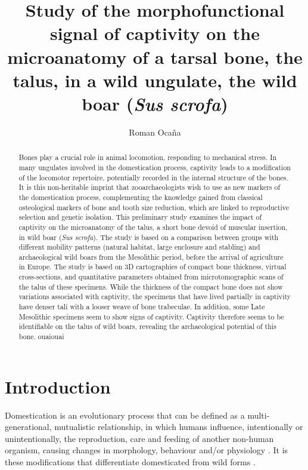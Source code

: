 \documentclass[12pt,a4paper]{article}
\title{Study of the morphofunctional signal of captivity on the microanatomy of a tarsal bone, the talus, in a wild ungulate, the wild boar (\textit{Sus scrofa})}
\author{Roman Ocaña}
\begin{document}
\maketitle
\tableofcontents
\setcounter{tocdepth}{6}

\begin{abstract}
    Bones play a crucial role in animal locomotion, responding to mechanical stress. In
many ungulates involved in the domestication process, captivity leads to a modification of the
locomotor repertoire, potentially recorded in the internal structure of the bones. It is this non-heritable imprint that zooarchaeologists wish to use as new markers of the domestication
process, complementing the knowledge gained from classical osteological markers of bone
and tooth size reduction, which are linked to reproductive selection and genetic isolation. This
preliminary study examines the impact of captivity on the microanatomy of the talus, a short
bone devoid of muscular insertion, in wild boar (\textit{Sus scrofa}). The study is based on a comparison between groups with different mobility patterns (natural habitat, large enclosure and stabling) and archaeological wild boars from the Mesolithic period, before the arrival of agriculture in Europe. The study is based on 3D cartographies of compact bone thickness, virtual cross-sections, and quantitative parameters obtained from microtomographic scans of the talus of these specimens. While the thickness of the compact bone does not show variations
associated with captivity, the specimens that have lived partially in captivity
have denser tali with a looser weave of bone trabeculae. In addition, some Late Mesolithic
specimens seem to show signs of captivity. Captivity therefore seems to be identifiable on the
talus of wild boars, revealing the archaeological potential of this bone. ouaiouai
\end{abstract}

\section{Introduction}
Domestication is an evolutionary process that can be defined as a multi-generational, mutualistic relationship, in which humans influence, intentionally or unintentionally, the reproduction, care and feeding of another non-human organism, causing changes in morphology, behaviour and/or physiology \cite{axelssonGenomicSignatureDog2013, kunzlWildMammalKept2003d, vigneOriginsAnimalDomestication2011d}. It is these modifications that differentiate domesticated from wild forms \cite{evinTestPaedomorphismDomestic2017r,zederPathwaysAnimalDomestication2012}.
\end{document}

